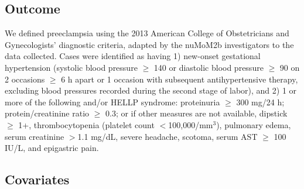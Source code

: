 \documentclass[12pt]{article}
\begin{document}
\subsection{Outcome}

We defined preeclampsia using the 2013 American College of Obstetricians and Gynecologists' diagnostic criteria,\cite{ACOG2019} adapted by the nuMoM2b investigators to the data collected.\cite{Facco2017} Cases were identified as having 1) new-onset gestational hypertension (systolic blood pressure $\geq$ 140 or diastolic blood pressure $\geq$ 90 on 2 occasions $\geq$ 6 h apart or 1 occasion with subsequent antihypertensive therapy, excluding blood pressures recorded during the second stage of labor), and 2) 1 or more of the following and/or HELLP syndrome: proteinuria $\geq$ 300 mg/24 h; protein/creatinine ratio $\geq$ 0.3; or if other measures are not available, dipstick $\geq$ 1+, thrombocytopenia (platelet count $<$100,000/mm$^3$), pulmonary edema, serum creatinine $>$1.1 mg/dL, severe headache, scotoma, serum AST $\geq$ 100 IU/L, and epigastric pain.\cite{ACOG2019}

\subsection{Covariates}
\end{document}
